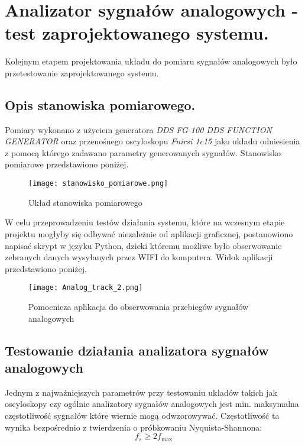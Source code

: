 \section{Analizator sygnałów analogowych - test zaprojektowanego systemu.}
    Kolejnym etapem projektowania układu do pomiaru sygnałów analogowych było przetestowanie 
    zaprojektowanego systemu.

\subsection{Opis stanowiska pomiarowego.}
    Pomiary wykonano z użyciem generatora \textit{DDS FG-100 DDS FUNCTION GENERATOR}
    oraz przenośnego oscyloskopu \textit{Fnirsi 1c15} jako układu odniesienia z pomocą którego
    zadawano parametry generowanych sygnałów. Stanowisko pomiarowe przedstawiono poniżej.

    \begin{figure}[!ht]
        \centering
        \texttt{[image: stanowisko\_pomiarowe.png]}
        \caption{Układ stanowiska pomiarowego}
        \label{fig:stanowisko_pomiarowe}
    \end{figure}

    W celu przeprowadzeniu testów działania systemu, które na wczesnym etapie projektu
    mogłyby się odbywać niezależnie od aplikacji graficznej, postanowiono napisać
    skrypt w języku Python, dzieki któremu możliwe było obserwowanie zebranych danych
    wysyłanych przez WIFI do komputera. Widok aplikacji przedstawiono poniżej.
    
    \begin{figure}[H]
        \centering
        \texttt{[image: Analog\_track\_2.png]}
        \caption{Pomocnicza aplikacja do obserwowania przebiegów sygnałów analogowych}
        \label{fig:Analog_track_2}
    \end{figure}

\subsection{Testowanie działania analizatora sygnałów analogowych}
    Jednym z najważniejszych parametrów przy testowaniu układów takich jak oscyloskopy
    czy ogólnie analizatory sygnałów analogowych jest min. maksymalna częstotliwość
    sygnałów które wiernie mogą odwzorowywać. Częstotliwość ta wynika bezpośrednio z 
    twierdzenia o próbkowaniu Nyquista-Shannona:
    \[
    f_s \geq 2 f_{\max}
    \]

